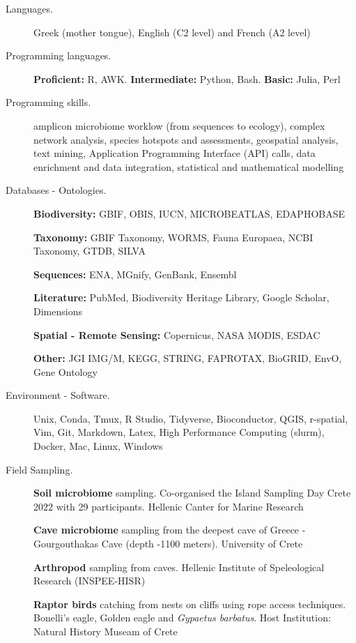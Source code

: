 \begin{description}
    \item[Languages.] Greek (mother tongue), English (C2 level) and French (A2 level)
   
    \item[Programming languages.]
            \textbf{Proficient:} R, AWK. \textbf{Intermediate:} Python, Bash. \textbf{Basic:} Julia, Perl

    
    \item[Programming skills.]
        amplicon microbiome worklow (from sequences to ecology), complex network analysis, species hotspots and assessments,
        geospatial analysis, text mining, Application Programming Interface (API) calls, data enrichment and data integration,
        statistical and mathematical modelling

  
    \item[Databases - Ontologies.]
        \textbf{Biodiversity:} GBIF, OBIS, IUCN, MICROBEATLAS, EDAPHOBASE

        \textbf{Taxonomy:} GBIF Taxonomy, WORMS, Fauna Europaea, NCBI Taxonomy, GTDB, SILVA

        \textbf{Sequences:} ENA, MGnify, GenBank, Ensembl

        \textbf{Literature:} PubMed, Biodiversity Heritage Library, Google Scholar, Dimensions

        \textbf{Spatial - Remote Sensing:} Copernicus, NASA MODIS, ESDAC

        \textbf{Other:} JGI IMG/M, KEGG, STRING, FAPROTAX, BioGRID, EnvO, Gene Ontology
    
    \item[Environment - Software.]
        Unix, Conda, Tmux, R Studio, Tidyverse, Bioconductor, QGIS, r-spatial, Vim, Git, Markdown,
        Latex, High Performance Computing (slurm), Docker, Mac, Linux, Windows

    \item[Field Sampling.] 
        \textbf{Soil microbiome} sampling. Co-organised the Island Sampling Day Crete 2022 with 29 participants.
        Hellenic Canter for Marine Research

        \textbf{Cave microbiome} sampling from the deepest cave of Greece - Gourgouthakas Cave (depth -1100 meters). University of Crete

        \textbf{Arthropod} sampling from caves. Hellenic Institute of Speleological Research (INSPEE-HISR)

        \textbf{Raptor birds} catching from nests on cliffs using rope access techniques.
            Bonelli's eagle, Golden eagle and \textit{Gypaetus barbatus}. Host Institution: Natural History Museam of Crete
    

\end{description}
